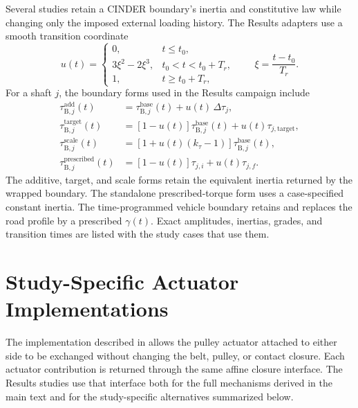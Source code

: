 \documentclass[11pt]{report}
\numberwithin{equation}{section}
\begin{document}
Several studies retain a CINDER boundary's inertia and constitutive law while
changing only the imposed external loading history.  The Results adapters use a
smooth transition coordinate
\begin{equation}
u(t)=
\begin{cases}
0, & t\le t_0,\\
3\xi^2-2\xi^3, & t_0<t<t_0+T_r,\\
1, & t\ge t_0+T_r,
\end{cases}
\qquad
\xi=\frac{t-t_0}{T_r}.
\label{eq:results_boundary_smoothstep}
\end{equation}
For a shaft $j$, the boundary forms used in the Results campaign include
\begin{align}
\tau_{\mathrm{B},j}^{\mathrm{add}}(t)
&=\tau_{\mathrm{B},j}^{\mathrm{base}}(t)+u(t)\,\Delta\tau_j,\\
\tau_{\mathrm{B},j}^{\mathrm{target}}(t)
&=[1-u(t)]\tau_{\mathrm{B},j}^{\mathrm{base}}(t)+u(t)\tau_{j,\mathrm{target}},\\
\tau_{\mathrm{B},j}^{\mathrm{scale}}(t)
&=[1+u(t)(k_\tau-1)]\tau_{\mathrm{B},j}^{\mathrm{base}}(t),\\
\tau_{\mathrm{B},j}^{\mathrm{prescribed}}(t)
&=[1-u(t)]\tau_{j,i}+u(t)\tau_{j,f}.
\label{eq:results_torque_boundary_family}
\end{align}
The additive, target, and scale forms retain the equivalent inertia returned by
the wrapped boundary.  The standalone prescribed-torque form uses a
case-specified constant inertia.  The time-programmed vehicle boundary retains
 and replaces the
road profile by a prescribed \(\gamma(t)\).  Exact amplitudes, inertias, grades,
and transition times are listed with the study cases that use them.

\section{Study-Specific Actuator Implementations}
\label{app:results_actuator_implementations}

The implementation described in  allows the
pulley actuator attached to either side to be exchanged without changing the
belt, pulley, or contact closure. Each actuator contribution is returned
through the same affine closure interface. The Results studies use that
interface both for the full mechanisms derived in the main text and for the
study-specific alternatives summarized below.
\end{document}
